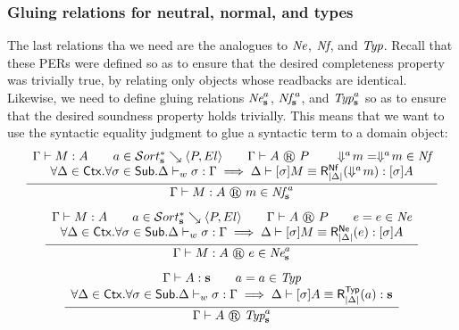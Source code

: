 \subsubsection{Gluing relations for neutral, normal, and types}

The last relations tha we need are the analogues to ${\normalfont\textit{Ne}}$, ${\normalfont\textit{Nf}}$, and ${\normalfont\textit{Typ}}$.
Recall that these \acp{PER} were defined so as to ensure that the desired completeness property was trivially true, by relating only objects whose readbacks are identical.
Likewise, we need to define gluing relations $\glune a$, $\glunf a$, and $\glutyp a$ so as to ensure that the desired soundness property holds trivially.
This means that we want to use the syntactic equality judgment to glue a syntactic term to a domain object:
\[
\begin{array}{c}
  \infer{
    \glutmjudg \Gamma M A m {\glunf a}
  }{
    \begin{array}{c}
      \wfexp \Gamma M A
      \qquad
      \glusortrel a P {El}
      \qquad
      \glutpjudg \Gamma A P
      \qquad
      \perrel {\dreify a m} {\dreify a m} \pernf
      \\
      \forall \Delta \in \Ctx. \forall \sigma \in \Sub. \wfwk \Delta \sigma \Gamma
      \implies \eqexp \Delta {\tmclo \sigma M} {\rbnffunc[|\Delta|] {\dreify a m}} {\tmclo \sigma A}
    \end{array}
  }
  \\[8pt]
  \infer{
    \glutmjudg \Gamma M A e {\glune a}
  }{
    \begin{array}{c}
      \wfexp \Gamma M A
      \qquad
      \glusortrel a P {El}
      \qquad
      \glutpjudg \Gamma A P
      \qquad
      \perrel e e \perne
      \\
      \forall \Delta \in \Ctx. \forall \sigma \in \Sub. \wfwk \Delta \sigma \Gamma
      \implies \eqexp \Delta {\tmclo \sigma M} {\rbnefunc[|\Delta|] e} {\tmclo \sigma A}
    \end{array}
  }
  \\[8pt]
  \infer{
    \glutpjudg \Gamma A {\glutyp a}
  }{
    \begin{array}{c}
      \wfexp \Gamma A {\tmcst s}
      \qquad
      \perrel a a \pertyp
      \\
      \forall \Delta \in \Ctx. \forall \sigma \in \Sub. \wfwk \Delta \sigma \Gamma
      \implies \eqexp \Delta {\tmclo \sigma A} {\rbtypfunc[|\Delta|] a} {\tmcst s}
    \end{array}
  }
\end{array}
\]

